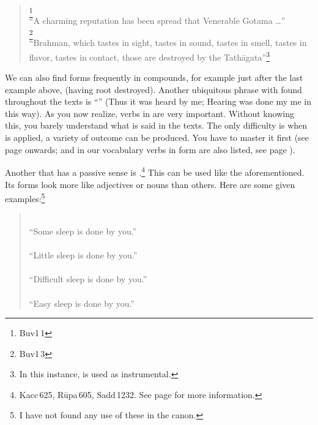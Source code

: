\begin{quote}
\footnote{Buv1\,1}\\
``A charming reputation has been spread that Venerable Gotama \ldots''\\[1.5mm]
\footnote{Buv1\,3}\\
``Brahman, which tastes in sight, tastes in sound, tastes in smell, tastes in flavor, tastes in contact, those are destroyed by the Tath\=agata''\footnote{In this instance,  is used as instrumental.}\\[1.5mm]
\end{quote}

We can also find  forms frequently in compounds, for example just after the last example above,  (having root destroyed). Another ubiquitous phrase with  found throughout the texts is ``'' (Thus it was heard by me; Hearing was done my me in this way). As you now realize, verbs in  are very important. Without knowing this, you barely understand what is said in the texts. The only difficulty is when  is applied, a variety of outcome can be produced. You have to master it first (see page \pageref{sec:irrprod} onwards; and in our vocabulary verbs in  form are also listed, see page \pageref{vocab:verb}).

Another  that has a passive sense is .\footnote{Kacc\,625, R\=upa\,605, Sadd\,1232. See page \pageref{pacck4:kha} for more information.} This can be used like the aforementioned. Its forms look more like adjectives or nouns than others. Here are some given examples:\footnote{I have not found any use of these in the canon.}

\begin{quote}
\\
``Some sleep is done by you.''\\
\\
``Little sleep is done by you.''\\
\\
``Difficult sleep is done by you.''\\
\\
``Easy sleep is done by you.''\\
\end{quote}

